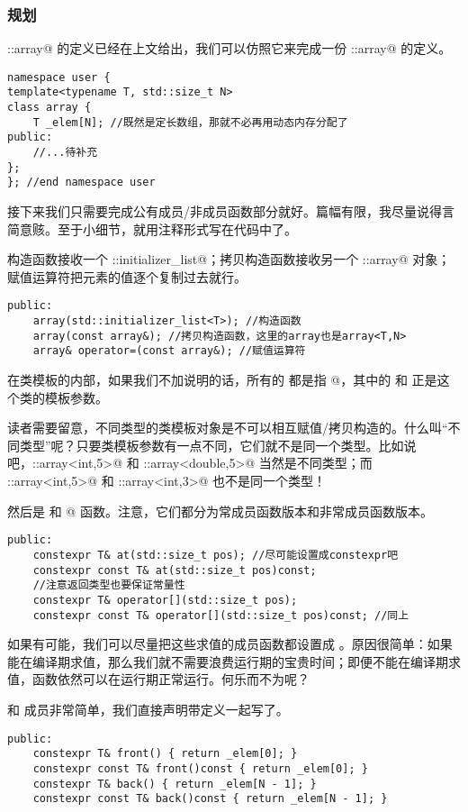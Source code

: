 \subsubsection*{规划}
\lstinline@std::array@ 的定义已经在上文给出，我们可以仿照它来完成一份 \lstinline@user::array@ 的定义。
\begin{lstlisting}
namespace user {
template<typename T, std::size_t N>
class array {
    T _elem[N]; //既然是定长数组，那就不必再用动态内存分配了
public:
    //...待补充
};
}; //end namespace user
\end{lstlisting}
接下来我们只需要完成公有成员/非成员函数部分就好。篇幅有限，我尽量说得言简意赅。至于小细节，就用注释形式写在代码中了。\par
构造函数接收一个 \lstinline@std::initializer_list@；拷贝构造函数接收另一个 \lstinline@user::array@ 对象；赋值运算符把元素的值逐个复制过去就行。
\begin{lstlisting}
public:
    array(std::initializer_list<T>); //构造函数
    array(const array&); //拷贝构造函数，这里的array也是array<T,N>
    array& operator=(const array&); //赋值运算符
\end{lstlisting}
在类模板的内部，如果我们不加说明的话，所有的 \lstinline@array@ 都是指 @，其中的 \lstinline@T@ 和 \lstinline@N@ 正是这个类的模板参数。\par
读者需要留意，不同类型的类模板对象是不可以相互赋值/拷贝构造的。什么叫``不同类型''呢？只要类模板参数有一点不同，它们就不是同一个类型。比如说吧，\lstinline@user::array<int,5>@ 和 \lstinline@user::array<double,5>@ 当然是不同类型；而 \lstinline@user::array<int,5>@ 和 \lstinline@user::array<int,3>@ 也不是同一个类型！\par
然后是 \lstinline@at@ 和 \lstinline@operator[]@ 函数。注意，它们都分为常成员函数版本和非常成员函数版本。
\begin{lstlisting}
public:
    constexpr T& at(std::size_t pos); //尽可能设置成constexpr吧
    constexpr const T& at(std::size_t pos)const;
    //注意返回类型也要保证常量性
    constexpr T& operator[](std::size_t pos);
    constexpr const T& operator[](std::size_t pos)const; //同上
\end{lstlisting}
如果有可能，我们可以尽量把这些求值的成员函数都设置成 \lstinline@constexpr@。原因很简单：如果能在编译期求值，那么我们就不需要浪费运行期的宝贵时间；即便不能在编译期求值，\lstinline@constexpr@ 函数依然可以在运行期正常运行。何乐而不为呢？\par
\lstinline@front@ 和 \lstinline@back@ 成员非常简单，我们直接声明带定义一起写了。
\begin{lstlisting}
public:
    constexpr T& front() { return _elem[0]; }
    constexpr const T& front()const { return _elem[0]; }
    constexpr T& back() { return _elem[N - 1]; }
    constexpr const T& back()const { return _elem[N - 1]; }
\end{lstlisting}\par
